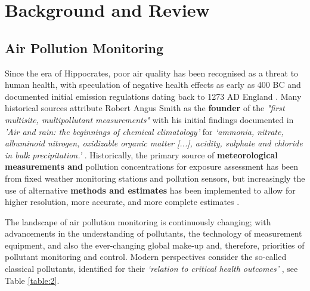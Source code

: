 \section{Background and Review}

\subsection{Air Pollution Monitoring} \label{Section:Air Poll}
Since the era of Hippocrates, poor air quality has been recognised as a threat to human health, with speculation of negative health effects as early as 400 BC and documented initial emission regulations dating back to 1273 AD England \cite{Fowler2020AQuality}. Many historical sources attribute Robert Angus Smith as the \textbf{founder} of the \textit{"first multisite, multipollutant measurements"} \citep{Fowler2020AQuality} with his initial findings documented in \textit{'Air and rain: the beginnings of chemical climatology'} \cite{Smith1872AirClimatology} for \emph{`ammonia, nitrate, albuminoid nitrogen, oxidizable organic matter [...], acidity, sulphate and chloride in bulk precipitation.'} \citep{Gorham1982RobertJSTOR}. Historically, the primary source of \textbf{meteorological measurements and} pollution concentrations for exposure assessment has been from fixed weather monitoring stations and pollution sensors, but increasingly the use of alternative \textbf{methods and estimates} has been implemented to allow for higher resolution, more accurate, and more complete estimates \textbf{\citep{Baxter2013ExposureRecommendations}}.

The landscape of air pollution monitoring is continuously changing; with advancements in the understanding of pollutants, the technology of measurement equipment, and also the ever-changing global make-up and, therefore, priorities of pollutant monitoring and control. Modern perspectives consider the so-called classical pollutants, identified for their \emph{`relation to critical health outcomes'} \citep{WorldHealthOrganization2021WHOMonoxide}, see Table \ref{table:2}.

